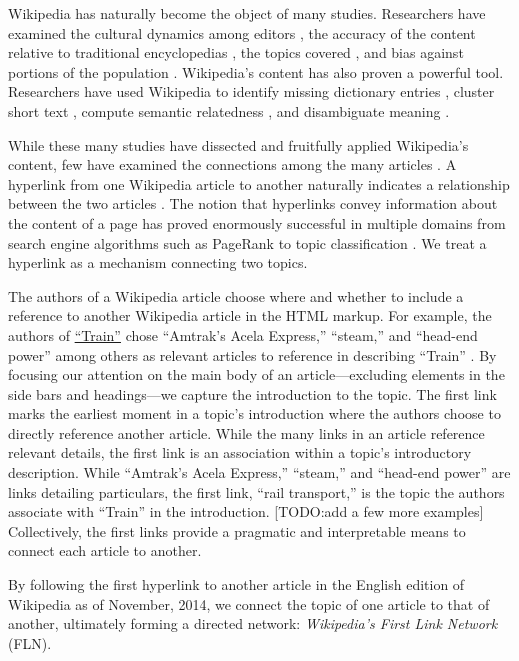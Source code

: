 \documentclass[11pt]{report}
\begin{document}
Wikipedia has naturally become the object of many studies. 
Researchers have examined the cultural dynamics among editors
\cite{editors},
the accuracy of the content relative to traditional encyclopedias
\cite{accuracy1, accuracy2},
the topics covered 
\cite{coverage},
and bias against portions of the population
\cite{bias_women}.
Wikipedia's content has also proven a powerful tool. 
Researchers have used Wikipedia to identify missing dictionary entries
\cite{missing_entries},
cluster short text
\cite{clustering},
compute semantic relatedness
\cite{semantic_relatedness},
and disambiguate meaning \cite{disambiguating}.

While these many studies have dissected and fruitfully applied Wikipedia's content,
few have examined the connections among the many articles
\cite{links_that_speak}.
A hyperlink from one Wikipedia article to another
naturally indicates a relationship between the two articles
\cite{relevance}.
The notion that hyperlinks convey information about the content of a
page has proved enormously successful in multiple domains from search engine algorithms 
such as PageRank 
\cite{pagerank} 
to topic classification
\cite{classifier}.
We treat a hyperlink as a mechanism connecting two topics.

The authors of a Wikipedia article choose where and whether to include a 
reference to another Wikipedia article
in the HTML markup.
For example, the authors of 
\href{https://en.wikipedia.org/wiki/Train}{``Train''}
chose
``Amtrak's Acela Express,'' ``steam,'' and ``head-end power'' 
among others as relevant articles to reference in describing ``Train''
\cite{wiki_train}
.
By focusing our attention on the main body of an article---excluding
elements in the side bars and headings---we capture the introduction to the topic.
The first link marks the earliest moment in a topic's introduction where the 
authors choose to directly reference another article. 
While the many links in an article reference relevant details, 
the first link is an association within a topic's introductory 
description. While 
``Amtrak's Acela Express,'' ``steam,'' and ``head-end power'' 
are links detailing particulars, the first link, ``rail transport,''
is the topic the authors associate with ``Train'' in the introduction. 
[TODO:add a few more examples]
Collectively, the first links provide a pragmatic and interpretable 
means to connect each article to another.

By following the first hyperlink to another article in the English edition of
Wikipedia as of November, 2014, we connect the topic of one article to that of another, ultimately forming a directed network: 
{\it Wikipedia's First Link Network} (FLN).
\end{document}
